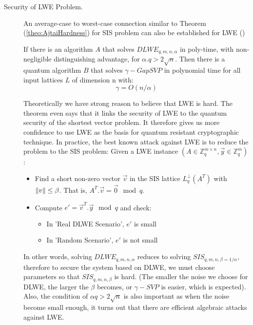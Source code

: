 \begin{description}
        \item [Security of LWE Problem.] An average-case to worst-case
            connection similar to Theorem (\ref{theo:AjtaiHardness}) for SIS
            problem can also be established for LWE (\cite{regev2005lattices})
            \begin{theorem}
                If there is an algorithm $A$ that solves $DLWE_{q,m,n,\alpha}$
                in poly-time, with non-negligible distinguishing advantage, for
                $\alpha . q > 2 \sqrt{n}$. Then there is a quantum algorithm
                $B$ that solves $\gamma-GapSVP$ in polynomial time for all input
                lattices $L$ of dimension n with:
                \[
                    \gamma = O(n/\alpha)
                \]

                \label{theo:RegevLWEHardness}
            \end{theorem}
            Theoretically we have strong reason to believe that LWE
            is hard. The theorem even says that it links the security of LWE to
            the quantum security of the shortest vector problem. It therefore
            gives us more confidence to use LWE as the basis for quantum
            resistant cryptographic technique. In practice, the best known
            attack against LWE is to reduce the problem to the SIS problem:
            Given a LWE instance $(A \in \mathbb{Z}_q^{m \times
            n},\vec{y} \in \mathbb{Z}_q^m)$:
            \begin{itemize}
                \item Find a short non-zero vector $\vec{v}$ in the SIS lattice
                    $L_q^\bot(A^T)$ with $\Vert v \Vert \leq \beta$. That is,
                    $A^T.\vec{v} = \vec{0} \mod q$.
                \item Compute $e' = \vec{v}^T.\vec{y} \mod q$ and check:
                    \begin{itemize}
                        \item In 'Real DLWE Scenario', $e'$ is small
                        \item In 'Random Scenario', $e'$ is not small
                    \end{itemize}
            \end{itemize}

            In other words, solving $DLWE_{q,m,n,\alpha}$ reduces to solving
            $SIS_{q,m,n,\beta=1/\alpha}$, therefore to secure the system based
            on DLWE, we must choose parameters so that $SIS_{q,m,n,\beta}$ is
            hard. (The smaller the noise we choose for DLWE, the larger the
            $\beta$ becomes, or $\gamma-SVP$ is easier, which is expected).
            Also, the condition of $\alpha q > 2\sqrt{n}$ is also important as
            when the noise become small enough, it turns out that there are
            efficient algebraic attacks against LWE.




\end{description}
